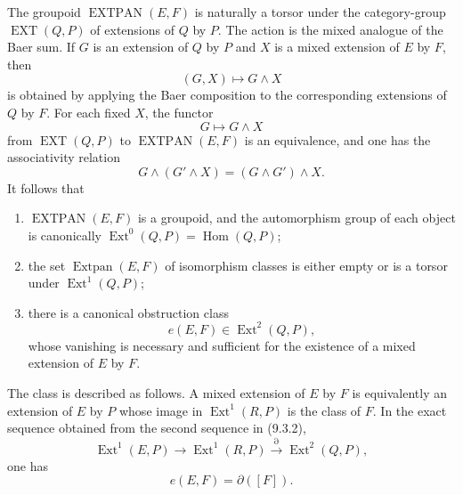 \documentclass[11pt]{article}
\newcommand{\Hom}{\operatorname{Hom}}
\newcommand{\Ext}{\operatorname{Ext}}
\newcommand{\Extpan}{\operatorname{Extpan}}
\newcommand{\EXTPAN}{\operatorname{EXTPAN}}
\newcommand{\EXT}{\operatorname{EXT}}
\begin{document}
The groupoid \(\EXTPAN(E,F)\) is naturally a torsor under the category-group \(\EXT(Q,P)\) of extensions of \(Q\) by \(P\).  The action is the mixed analogue of the Baer sum.  If \(G\) is an extension of \(Q\) by \(P\) and \(X\) is a mixed extension of \(E\) by \(F\), then
\begin{equation}\tag{9.3.5}
        (G,X)\longmapsto G\wedge X
\end{equation}
is obtained by applying the Baer composition to the corresponding extensions of \(Q\) by \(F\).  For each fixed \(X\), the functor
\[
        G\longmapsto G\wedge X
\]
from \(\EXT(Q,P)\) to \(\EXTPAN(E,F)\) is an equivalence, and one has the associativity relation
\begin{equation}\tag{9.3.7}
        G\wedge(G'\wedge X)=(G\wedge G')\wedge X.
\end{equation}
It follows that
\begin{enumerate}[label=\alph*)]
\item \(\EXTPAN(E,F)\) is a groupoid, and the automorphism group of each object is canonically \(\Ext^0(Q,P)=\Hom(Q,P)\);
\item the set \(\Extpan(E,F)\) of isomorphism classes is either empty or is a torsor under \(\Ext^1(Q,P)\);
\item there is a canonical obstruction class
\begin{equation}\tag{9.3.9}
        e(E,F)\in\Ext^2(Q,P),
\end{equation}
whose vanishing is necessary and sufficient for the existence of a mixed extension of \(E\) by \(F\).
\end{enumerate}
The class is described as follows.  A mixed extension of \(E\) by \(F\) is equivalently an extension of \(E\) by \(P\) whose image in \(\Ext^1(R,P)\) is the class of \(F\).  In the exact sequence obtained from the second sequence in (9.3.2),
\[
        \Ext^1(E,P)\longrightarrow\Ext^1(R,P)
        \xrightarrow{\partial}\Ext^2(Q,P),
\]
one has
\begin{equation}\tag{9.3.10}
        e(E,F)=\partial([F]).
\end{equation}
\end{document}
